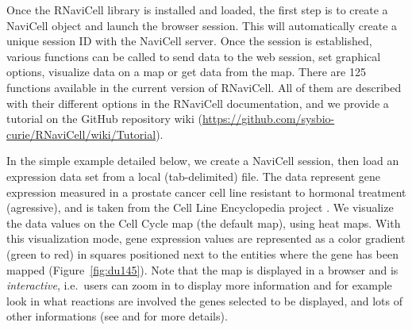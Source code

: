 Once the RNaviCell library is installed and loaded, the first step is to create
a NaviCell object and launch the browser session. This will automatically create
a unique session ID with the NaviCell server. Once the session is established,
various functions can be called to send data to the web session, set graphical
options, visualize data on a map or get data from the map. There are 125
functions available in the current version of RNaviCell. All of them are
described with their different options in the RNaviCell documentation, and we
provide a tutorial on the GitHub repository wiki
(\url{https://github.com/sysbio-curie/RNaviCell/wiki/Tutorial}).  

In the simple example detailed below, we create a NaviCell session, then load
an expression data set from a local (tab-delimited) file. The data represent
gene expression measured in a prostate cancer cell line resistant to hormonal
treatment (agressive), and is taken from the Cell Line Encyclopedia project
\citep{barretina2012cancer}. We visualize the data values on the Cell Cycle map
(the default map), using heat maps. With this visualization mode, gene
expression values are represented as a color gradient (green to red) in squares
positioned next to the entities where the gene has been mapped
(Figure~\ref{fig:du145}). Note that the map is displayed in a browser and is
\emph{interactive}, i.e.\ users can zoom in to display more information and for
example look in what reactions are involved the genes selected to be displayed,
and lots of other informations (see \cite{bonnet2015navicell} and
\cite{kuperstein2015atlas} for more details).


